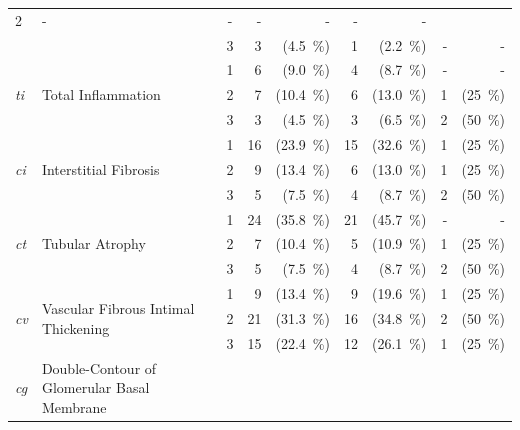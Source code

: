 \begin{table}[tbp]
{\begin{tabular}{ll c rr rr rr}
        2 & %
        - & - & - & - & - & - 
        \\ & & 
        3 & %
        3 & (4.5~\%) & 1 & (2.2~\%) & - & - 
        \\\hline
        \multirow{3}{0.5in}{\emph{ti}} & 
        \multirow{3}{1.5in}{Total Inflammation} & 
        1 & %
        6 & (9.0~\%) & 4 & (8.7~\%) & - & - 
        \\ & & 
        2 &  %
        7 & (10.4~\%) & 6 & (13.0~\%) & 1 & (25~\%)
        \\ & & 
        3 & %
        3 & (4.5~\%) & 3 & (6.5~\%) & 2 & (50~\%)
        \\\hline
        \multirow{3}{0.5in}{\emph{ci}} & 
        \multirow{3}{1.5in}{Interstitial Fibrosis} & 
        1 & %
        16 & (23.9~\%) & 15 & (32.6~\%) & 1 & (25~\%)
        \\ & & 
        2 & %
        9 & (13.4~\%) & 6 & (13.0~\%) & 1 & (25~\%)
        \\ & & 
        3 & %
        5 & (7.5~\%) & 4 & (8.7~\%) & 2 & (50~\%)
        \\\hline
        \multirow{3}{0.5in}{\emph{ct}} & 
        \multirow{3}{1.5in}{Tubular Atrophy} & 
        1 & %
        24 & (35.8~\%) & 21 & (45.7~\%) & - & - 
        \\ & & 
        2 & %
        7 & (10.4~\%) & 5 & (10.9~\%) & 1 & (25~\%)
        \\ & & 
        3 & %
        5 & (7.5~\%) & 4 & (8.7~\%) & 2 & (50~\%)
        \\\hline
        \multirow{3}{0.5in}{\emph{cv}} & 
        \multirow{3}{1.5in}{Vascular Fibrous Intimal Thickening} & 
        1 & %
        9 & (13.4~\%) & 9 & (19.6~\%) & 1 & (25~\%)
        \\ & & 
        2 & %
        21 & (31.3~\%) & 16 & (34.8~\%) & 2 & (50~\%)
        \\ & & 
        3 & %
        15 & (22.4~\%) & 12 & (26.1~\%) & 1 & (25~\%)
        \\\hline
        \multirow{3}{0.5in}{\emph{cg}} & 
        \multirow{3}{1.5in}{Double-Contour of Glomerular Basal Membrane} & 

\end{tabular}}
\end{table}
